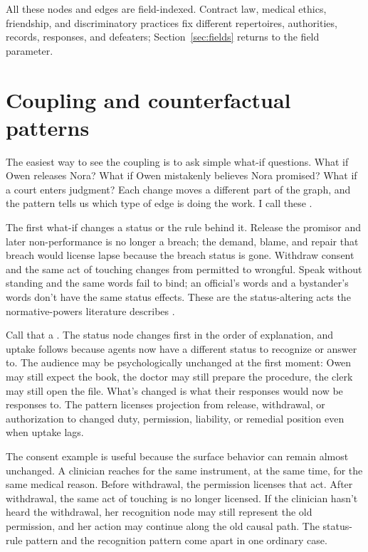 \documentclass[12pt]{article}
\begin{document}
All these nodes and edges are field-indexed. Contract law, medical ethics, friendship, and discriminatory practices fix different repertoires, authorities, records, responses, and defeaters; Section~\ref{sec:fields} returns to the field parameter.

\section{Coupling and counterfactual patterns}
\label{sec:coupling}

The easiest way to see the coupling is to ask simple what-if questions. What if Owen releases Nora? What if Owen mistakenly believes Nora promised? What if a court enters judgment? Each change moves a different part of the graph, and the pattern tells us which type of edge is doing the work. I call these .

The first what-if changes a status or the rule behind it. Release the promisor and later non-performance is no longer a breach; the demand, blame, and repair that breach would license lapse because the breach status is gone. Withdraw consent and the same act of touching changes from permitted to wrongful. Speak without standing and the same words fail to bind; an official's words and a bystander's words don't have the same status effects. These are the status-altering acts the normative-powers literature describes \citep{owens2012ShapingNormativeLandscape,raz2022NormativePowers}.

Call that a . The status node changes first in the order of explanation, and uptake follows because agents now have a different status to recognize or answer to. The audience may be psychologically unchanged at the first moment: Owen may still expect the book, the doctor may still prepare the procedure, the clerk may still open the file. What's changed is what their responses would now be responses to. The pattern licenses projection from release, withdrawal, or authorization to changed duty, permission, liability, or remedial position even when uptake lags.

The consent example is useful because the surface behavior can remain almost unchanged. A clinician reaches for the same instrument, at the same time, for the same medical reason. Before withdrawal, the permission licenses that act. After withdrawal, the same act of touching is no longer licensed. If the clinician hasn't heard the withdrawal, her recognition node may still represent the old permission, and her action may continue along the old causal path. The status-rule pattern and the recognition pattern come apart in one ordinary case.
\end{document}
